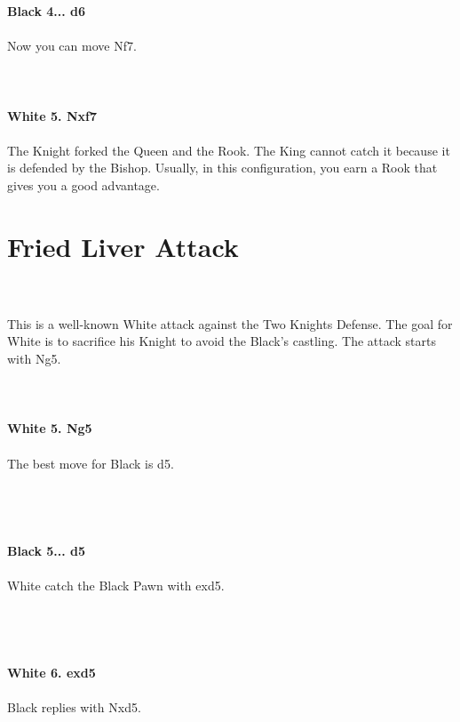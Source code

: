 \documentclass{article}
\begin{document}
\textbf{Black 4... d6}\\
\\
Now you can move Nf7.\\
\\

\\
\\
\textbf{White 5. Nxf7}\\
\\
The Knight forked the Queen and the Rook. The King cannot catch it because it is defended by the Bishop. Usually, in this configuration, you earn a Rook that gives you a good advantage.\\\section{ Fried Liver Attack}

\\
\\
This is a well-known White attack against the Two Knights Defense. The goal for White is to sacrifice his Knight to avoid the Black's castling. The attack starts with Ng5.\\
\\

\\
\\
\textbf{White 5. Ng5}\\
\\
The best move for Black is d5.\\\\
\\

\\
\\
\textbf{Black 5... d5}\\
\\
White catch the Black Pawn with exd5.\\\\
\\

\\
\\
\textbf{White 6. exd5}\\
\\
Black replies with Nxd5.\\
\\

\\
\\
\end{document}
